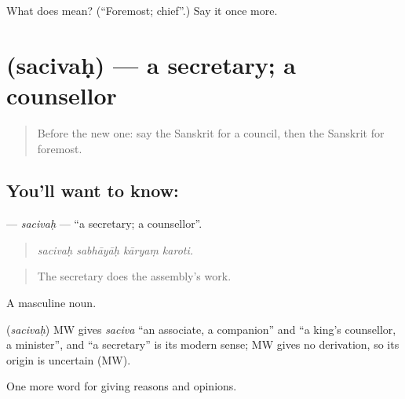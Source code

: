 \begin{tcolorbox}[breakable,colback=teal!4,colframe=teal!35!black,title={Before you move on}]
What does  mean? (\textquotedblleft{}Foremost; chief\textquotedblright{}.) Say it once more.
\end{tcolorbox}
\section[\texorpdfstring{\sk{सचिवः} (sacivaḥ)}{सचिवः (sacivaḥ)}]{ (sacivaḥ) — a secretary; a counsellor}

\label{lesson:SA-C357-sacivah}



\begin{quote}
Before the new one: say the Sanskrit for a council, then the Sanskrit for foremost.
\end{quote}

\subsection*{You'll want to know: }
\textbf{} — \emph{sacivaḥ} — \textquotedblleft{}a secretary; a counsellor\textquotedblright{}.

\begin{quote}
   
\end{quote}

\begin{quote}
\emph{sacivaḥ sabhāyāḥ kāryaṃ karoti.}
\end{quote}

\begin{quote}
The secretary does the assembly's work.
\end{quote}

A masculine noun.

\begin{cousinweb}
\textbf{} (\emph{sacivaḥ}) MW gives \emph{saciva} \textquotedblleft{}an associate, a companion\textquotedblright{} and \textquotedblleft{}a king's counsellor, a minister\textquotedblright{}, and \textquotedblleft{}a secretary\textquotedblright{} is its modern sense; MW gives no derivation, so its origin is uncertain (MW).
\end{cousinweb}

\begin{grammarlens}[title={What you've built}]
One more word for giving reasons and opinions.
\end{grammarlens}

